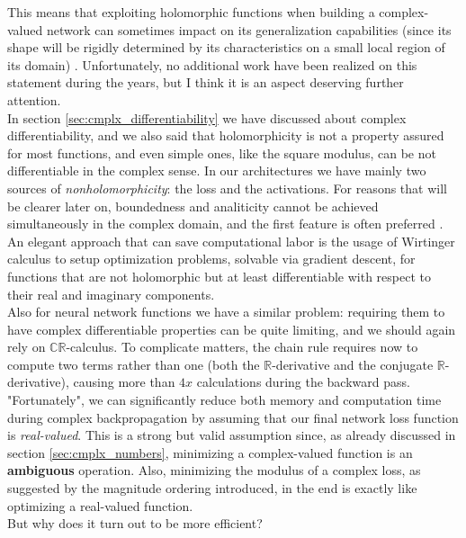 \documentclass[../main.tex]{subfiles}
\begin{document}
This means that exploiting holomorphic functions when building a complex-valued network can sometimes impact on its generalization capabilities (since its shape will be rigidly determined by its characteristics on a small local region of its domain) \cite{hirose_cvnn}. Unfortunately, no additional work have been realized on this statement during the years, but I think it is an aspect deserving further attention.\\
In section \ref{sec:cmplx_differentiability} we have discussed about complex differentiability, and we also said that holomorphicity is not a property assured for most functions, and even simple ones, like the square modulus, can be not differentiable in the complex sense. In our architectures we have mainly two sources of \textit{nonholomorphicity}: the loss and the activations. For reasons that will be clearer later on, boundedness and analiticity cannot be achieved simultaneously in the complex domain, and the first feature is often preferred \cite{amin_wirtinger}.\\
An elegant approach that can save computational labor is the usage of Wirtinger calculus to setup optimization problems, solvable via gradient descent, for functions that are not holomorphic but at least differentiable with respect to their real and imaginary components.\\
Also for neural network functions we have a similar problem: requiring them to have complex differentiable properties can be quite limiting, and we should again rely on $\mathds{CR}$-calculus. To complicate matters, the chain rule requires now to compute two terms rather than one (both the $\mathds{R}$-derivative and the conjugate $\mathds{R}$-derivative), causing more than $4x$ calculations during the backward pass.\\
"Fortunately", we can significantly reduce both memory and computation time during complex backpropagation by assuming that our final network loss function is \textit{real-valued}. This is a strong but valid assumption since, as already discussed in section \ref{sec:cmplx_numbers}, minimizing a complex-valued function is an \textbf{ambiguous} operation. Also, minimizing the modulus of a complex loss, as suggested by the magnitude ordering introduced, in the end is exactly like optimizing a real-valued function.\\
But why does it turn out to be more efficient? 
\end{document}
